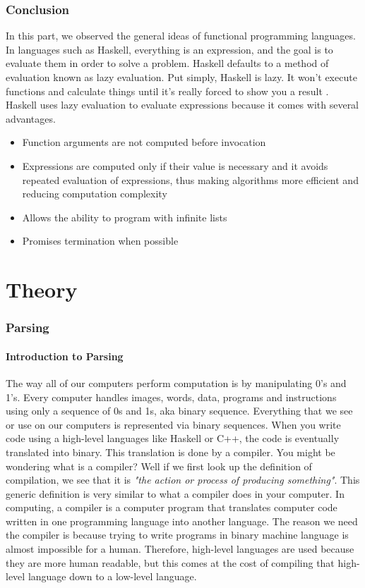 \documentclass{article}
\begin{document}
\section{Conclusion}\label{conclusion}
In this part, we observed the general ideas of functional programming languages. In languages such as Haskell, everything is an expression, and the goal is to evaluate them in order to solve a problem. Haskell defaults to a method of evaluation known as lazy evaluation. Put simply, Haskell is lazy. It won’t execute functions and calculate things until it’s really forced to show you a result \cite{LYAH}. Haskell uses lazy evaluation to evaluate expressions because it comes with several advantages. 

\begin{itemize}
    \item Function arguments are not computed before invocation
    \item Expressions are computed only if their value is necessary and it avoids repeated evaluation of expressions, thus making algorithms more efficient and reducing computation complexity
    \item Allows the ability to program with infinite lists
    \item Promises termination when possible  

\end{itemize}

\part{Theory}

\section{Parsing}
\subsection{Introduction to Parsing}
The way all of our computers perform computation is by manipulating 0's and 1's. Every computer handles images, words, data, programs and instructions using only a sequence of 0s and 1s, aka binary sequence. Everything that we see or use on our computers is represented via binary sequences. When you write code using a high-level languages like Haskell or C++, the code is eventually translated into binary. This translation is done by a compiler. You might be wondering what is a compiler? Well if we first look up the definition of compilation, we see that it is \textit{"the action or process of producing something"}. This generic definition is very similar to what a compiler does in your computer. In computing, a compiler is a computer program that translates computer code written in one programming language into another language. The reason we need the compiler is because trying to write programs in binary machine language is almost impossible for a human. Therefore, high-level languages are used because they are more human readable, but this comes at the cost of compiling that high-level language down to a low-level language.
\end{document}
